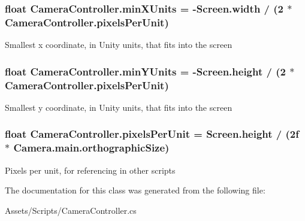 \subsubsection[{\texorpdfstring{min\+X\+Units}{minXUnits}}]{\setlength{\rightskip}{0pt plus 5cm}float Camera\+Controller.\+min\+X\+Units = -\/Screen.\+width / (2 $\ast$ {\bf Camera\+Controller.\+pixels\+Per\+Unit})\hspace{0.3cm}{\ttfamily [static]}}\hypertarget{class_camera_controller_ac90d1e4d5543392c96f8cbcebac532f8}{}\label{class_camera_controller_ac90d1e4d5543392c96f8cbcebac532f8}


Smallest x coordinate, in Unity units, that fits into the screen 

\subsubsection[{\texorpdfstring{min\+Y\+Units}{minYUnits}}]{\setlength{\rightskip}{0pt plus 5cm}float Camera\+Controller.\+min\+Y\+Units = -\/Screen.\+height / (2 $\ast$ {\bf Camera\+Controller.\+pixels\+Per\+Unit})\hspace{0.3cm}{\ttfamily [static]}}\hypertarget{class_camera_controller_a26974b89d53c6dc5c1e47faa2fc2657b}{}\label{class_camera_controller_a26974b89d53c6dc5c1e47faa2fc2657b}


Smallest y coordinate, in Unity units, that fits into the screen 

\subsubsection[{\texorpdfstring{pixels\+Per\+Unit}{pixelsPerUnit}}]{\setlength{\rightskip}{0pt plus 5cm}float Camera\+Controller.\+pixels\+Per\+Unit = Screen.\+height / (2f $\ast$ Camera.\+main.\+orthographic\+Size)\hspace{0.3cm}{\ttfamily [static]}}\hypertarget{class_camera_controller_ae7f8453382d363abe462f24a4a025d77}{}\label{class_camera_controller_ae7f8453382d363abe462f24a4a025d77}


Pixels per unit, for referencing in other scripts 



The documentation for this class was generated from the following file\+:\begin{DoxyCompactItemize}
\item 
Assets/\+Scripts/Camera\+Controller.\+cs\end{DoxyCompactItemize}
